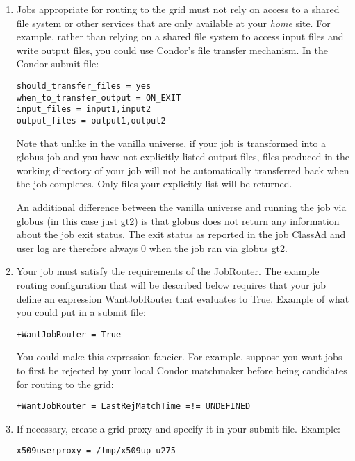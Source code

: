 \begin{enumerate}

\item Jobs appropriate for routing to the grid must not rely on access to
a shared file system or other services that are only available at your
\textit{home} site.  For example, rather than relying on a shared file system
to access input files and write output files, you could use Condor's file
transfer mechanism.  In the Condor submit file:

\begin{verbatim}
should_transfer_files = yes
when_to_transfer_output = ON_EXIT
input_files = input1,input2
output_files = output1,output2
\end{verbatim}

Note that unlike in the vanilla universe, if your job is
transformed into a globus job and you have not explicitly listed
output files, files produced in the working directory of your job will
not be automatically transferred back when the job completes.  Only
files your explicitly list will be returned.

An additional difference between the vanilla universe and running the
job via globus (in this case just gt2) is that globus does not return
any information about the job exit status.  The exit status as
reported in the job ClassAd and user log are therefore always 0 when
the job ran via globus gt2.

\item Your job must satisfy the requirements of the JobRouter.  The example
routing configuration that will be described below requires that your job
define an expression WantJobRouter that evaluates to True.  Example of
what you could put in a submit file:

\begin{verbatim}
+WantJobRouter = True
\end{verbatim}

You could make this expression fancier.  For example, suppose you want
jobs to first be rejected by your local Condor matchmaker before being
candidates for routing to the grid:

\begin{verbatim}
+WantJobRouter = LastRejMatchTime =!= UNDEFINED
\end{verbatim}

\item If necessary, create a grid proxy and specify it in your submit
file.  Example:

\begin{verbatim}
x509userproxy = /tmp/x509up_u275
\end{verbatim}


\end{enumerate}
